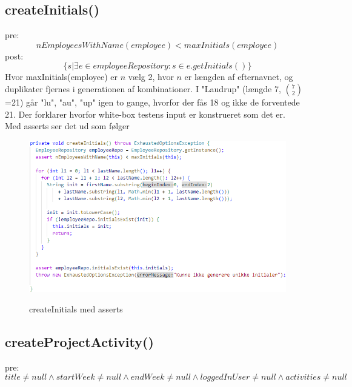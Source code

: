 \subsection{createInitials()} \label{sec:contract_create_initials}
pre:
\begin{equation}
    nEmployeesWithName(employee) < maxInitials(employee)
\end{equation}
post:
\begin{equation}
    \{s | \exists e \in employeeRepository : s \in e.getInitials()\}
\end{equation}
Hvor maxInitials(employee) er $n$ vælg 2, hvor $n$ er længden af efternavnet, og duplikater fjernes i generationen af kombinationer.
I "Laudrup" (længde 7, $7 \choose 2$=21) går "lu", "au", "up" igen to gange, hvorfor der fås 18 og ikke de forventede 21. Der forklarer hvorfor white-box testens input er konstrueret som det er.\\[4mm]
Med asserts ser det ud som følger
\begin{figure}[H]
    \centering
    \caption{createInitials med asserts}
    \includegraphics[width = \textwidth, keepaspectratio]{ImplementationAndTest/Diagrams/contract_createInitials.png}
    \label{fig:contract_createInitials}
\end{figure}
\subsection{createProjectActivity()} \label{sec:contract_create_project_activity}
pre: 
\begin{equation}
    title \neq null \wedge startWeek \neq null \wedge endWeek \neq null \wedge loggedInUser \neq null \wedge activities \neq null
\end{equation}

